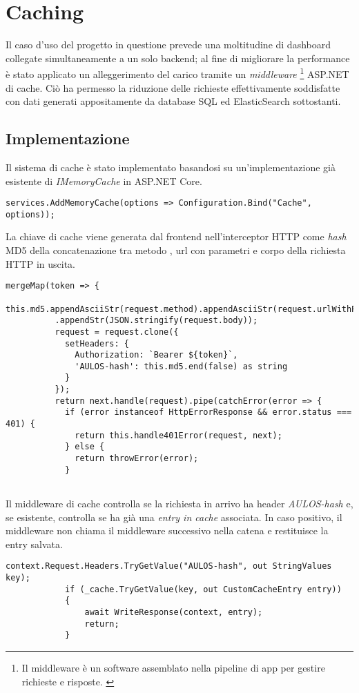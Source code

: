 \section{Caching}
\label{ch:caching}
Il caso d'uso del progetto in questione prevede una moltitudine di dashboard collegate simultaneamente a un solo backend; al fine di  migliorare la performance è stato applicato un alleggerimento del carico tramite un \textit{middleware} \footnote{Il middleware è un software assemblato nella pipeline di app per gestire richieste e risposte. \cite{Middleware}} ASP.NET di cache. Ciò ha permesso la riduzione delle richieste effettivamente soddisfatte con dati generati appositamente da database SQL ed ElasticSearch sottostanti.
\subsection{Implementazione}
Il sistema di cache è stato implementato basandosi su un'implementazione già esistente di \textit{IMemoryCache} in ASP.NET Core. \cite{MemCache}
\begin{lstlisting}[caption={Startup.cs, iniezione Memory Cache}, style=javaScriptCode]
services.AddMemoryCache(options => Configuration.Bind("Cache", options));
\end{lstlisting}

La chiave di cache viene generata dal frontend nell'interceptor HTTP come \textit{hash} MD5 \cite{MD5} della concatenazione tra metodo \cite{HTTPMETHODS}, url con parametri \cite{HTTPPARAMS} e corpo \cite{HTTPBODY} della richiesta HTTP in uscita.
\begin{lstlisting}[caption={it-http-security.interceptor.ts, riga 28}, style=javaScriptCode]
mergeMap(token => {
          this.md5.appendAsciiStr(request.method).appendAsciiStr(request.urlWithParams)
          .appendStr(JSON.stringify(request.body));
          request = request.clone({
            setHeaders: {
              Authorization: `Bearer ${token}`,
              'AULOS-hash': this.md5.end(false) as string
            }
          });
          return next.handle(request).pipe(catchError(error => {
            if (error instanceof HttpErrorResponse && error.status === 401) {
              return this.handle401Error(request, next);
            } else {
              return throwError(error);
            }
          
\end{lstlisting}

Il middleware di cache controlla se la richiesta in arrivo ha header \textit{AULOS-hash} e, se esistente, controlla se ha già una \textit{entry in cache} associata. In caso positivo, il middleware non chiama il middleware successivo nella catena e restituisce la entry salvata.
\begin{lstlisting}[caption={TotallyOriginalCachingMiddleware.cs, Cache hit}, style=javaScriptCode]
context.Request.Headers.TryGetValue("AULOS-hash", out StringValues key);
            if (_cache.TryGetValue(key, out CustomCacheEntry entry))
            {
                await WriteResponse(context, entry);
                return;
            }
\end{lstlisting}

